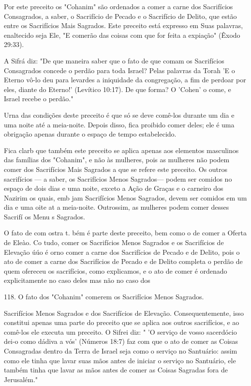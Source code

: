 \begin{itemize}
\begin{enumrate}
\begin{itemize}
\begin{itemize}
Por este preceito os "Cohanim" são ordenados a comer a carne dos
Sacrifícios Consagrados, a saber, o Sacrifício de Pecado e o Sacrifício
de Delito, que estão entre os Sacrifícios Mais Sagrados. Este preceito
está expresso em Suas palavras, enaltecido seja Ele, "E comerão das
coisas com que for feita a expia­ção" (Êxodo 29:33).

A Sifrá diz: "De que maneira saber que o fato de que comam os
Sa­crifícios Consagrados concede o perdão para toda Israel? Pelas
palavras da To­rah 'E o Eterno vô-lo deu para levardes a iniquidade da
congregação, a fim de perdoar por eles, diante do Eterno!' (Levítico
10:17). De que forma? O 'Cohen' o come, e Israel recebe o perdão."

Urna das condições deste preceito é que só se deve comê-los duran­te um
dia e uma noite até a meia-noite. Depois disso, fica proibido comer
de­les; ele é uma obrigação apenas durante o espaço de tempo
estabelecido.

Fica clarb que também este preceito se aplica apenas aos elementos
masculinos das famílias dos "Cohanim", e não às mulheres, pois as
mulheres não podem comer dos Sacrifícios Mais Sagrados a que se refere
este preceito. Os outros sacrifícios --- a saber, os Sacrifícios Menos
Sagrados--- podem ser co­midos no espaço de dois dias e uma noite,
exceto a Ação de Graças e o carnei­ro dos Nazirim os quais, emb jam
Sacrifícios Menos Sagrados, devem ser comidos em um dia e uma oite at a
meia-noite. Outrossim, as mulheres po­dem comer desses Sacrifí os Menu s
Sagrados.

O fato de com ostra t. bém é parte deste preceito, bem como o de comer a
Oferta de Eleào. Co tudo, comer os Sacrifícios Menos Sagrados e os
Sacrifícios de Elevação úúo é orno comer a carne dos Sacrifícios de
Peca­do e de Delito, pois o ato de comer a carne dos Sacrifícios de
Pecado e de Deli­to completa o perdão de quem ofereceu os sacrifícios,
como explicamos, e o ato de comer é ordenado explicitamente no caso
deles mas não no caso dos

118. O fato dos "Cohanim" comerem os Sacrifícios Menos Sagrados.

Sacrifícios Menos Sagrados e dos Sacrifícios de Elevação.
Consequentemente, isso constitui apenas uma parte do preceito que se
aplica aos outros sacrifícios, e ao comê-los ele executa um preceito. O
Sifrei diz: " 'O serviço de vosso sa­cerdócio dei-o como dádiva a vós'
(Números 18:7) faz com que o ato de comer as Coisas Consagradas dentro
da Terra de Israel seja como o serviço no Santuá­rio: assim como ele
tinha que lavar suas mãos antes de iniciar o serviço no San­tuário, ele
também tinha que lavar as mãos antes de comer as Coisas Sagradas fora de
Jerusalém."



\end{itemize}
\end{itemize}
\end{enumrate}
\end{itemize}
